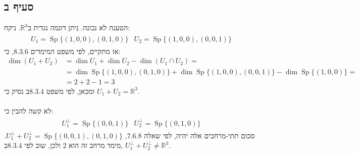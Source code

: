 \documentclass{article}
\DeclareMathOperator\Sp{Sp}
\def\reals{\mathbb{R}}
\begin{document}
\subsection*{סעיף ב}

הטענה לא נכונה. ניתן דוגמה נגדית ב$\reals^3$. ניקח:
\begin{align*}
    \begin{matrix}
        U_1=\Sp\{ (1,0,0), (0,1,0) \} & U_2 = \Sp\{ (1,0,0), (0,0,1) \}
    \end{matrix}
\end{align*}
אז מתקיים, לפי משפט המימדים $8.3.6$, כי:
\begin{align*}
    \dim (U_1+U_2) & =\dim U_1 + \dim U_2 - \dim(U_1\cap U_2)=                                                  \\
                   & = \dim \Sp\{ (1,0,0), (0,1,0) \} + \dim \Sp\{ (1,0,0), (0,0,1) \} - \dim \Sp\{ (1,0,0) \}= \\
                   & = 2 + 2 - 1 = 3
\end{align*}
ומכאן, לפי משפט $8.3.4$ב נסיק כי $U_1+U_2=\reals^3$.
\\\\
לא קשה להבין כי:
\begin{align*}
    \begin{matrix}
        U_1^\perp=\Sp\{ (0,0,1) \} & U_2^\perp = \Sp\{ (0,1,0) \}
    \end{matrix}
\end{align*}
סכום תתי-מרחבים אלה יהיה, לפי שאלה $7.6.8$, $U_1^\perp+U_2^\perp=\Sp \{ (0,0,1), (0,1,0) \}$. מימד מרחב זה הוא 2 ולכן, שוב לפי $8.3.4$ב, $U_1^\perp + U_2^\perp\ne \reals^3$.
\end{document}
